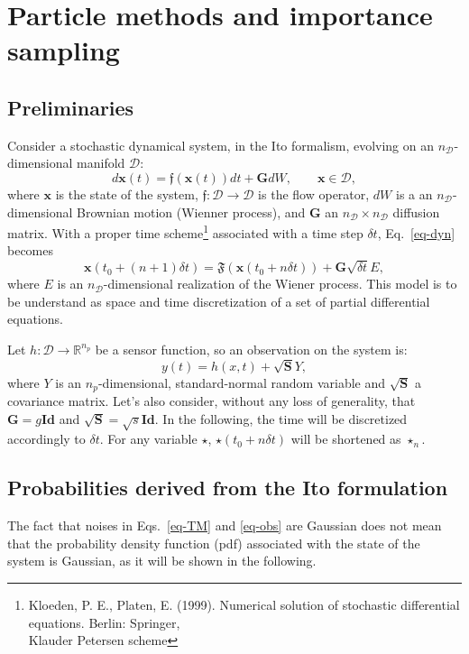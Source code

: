 \documentclass[aip,pof,nofootinbib,reprint,onecolumn]{revtex4-1}
\newcommand{\gras}[1]{\boldsymbol{#1}}
\newcommand{\mypar}[1]{\left(#1\right)}
\newcommand{\Ephaz}{\mathcal{D}}%
\newcommand{\Nphaz}{n_{\mathcal{D}}} %
\newcommand{\Nm}{n_p} %
\newcommand{\flot}{\mathfrak{f}} %
\newcommand{\fint}{\mathfrak{F}} %
\newcommand{\obs}{y} %
\newcommand{\point}{\gras{x}} %
\begin{document}
%
\section{Particle methods and importance sampling}
\label{sec-ipf}
\subsection{Preliminaries}
Consider a stochastic dynamical system, in the Ito formalism, evolving on an $\Nphaz$-dimensional manifold $\Ephaz$:
\begin{equation}
d \point\mypar{t} = \flot\mypar{\point\mypar{t}}dt + \gras{G}dW, \qquad \point \in \Ephaz,
\label{eq-dyn}
\end{equation}
where $\point$ is the state of the system, $\flot:\Ephaz \rightarrow \Ephaz$
is the flow operator, $dW$ is a an $\Nphaz$-dimensional Brownian motion
(Wienner process), and $\gras{G}$ an $\Nphaz\times \Nphaz$ diffusion matrix.
With a proper time scheme\footnote{Kloeden, P. E., Platen, E. (1999).
  Numerical solution of stochastic differential equations. Berlin:
  Springer,\\ Klauder Petersen scheme} associated with a time step
$\delta t$, Eq.~\eqref{eq-dyn} becomes
\begin{equation}
\point\mypar{t_0+\mypar{n+1}\delta t} =  \fint\mypar{\point\mypar{t_0+n\delta t}}+\gras{G}\sqrt{\delta t} E,
\label{eq-TM}
\end{equation}
where $E$ is an $\Nphaz$-dimensional realization of the Wiener process. 
This model is to be understand as space and time discretization of a set of partial differential equations.

Let $h:\Ephaz \rightarrow \mathbb{R}^{\Nm}$ be a sensor function, so an observation on the system is:
\begin{equation}
 \obs(t) = h\mypar{x,t} + \sqrt{\gras{S}}Y,
\label{eq-obs}
\end{equation}
where $Y$ is an $\Nm$-dimensional, standard-normal random variable and
$\sqrt{\gras{S}}$ a covariance matrix. Let's also consider, without any loss
of generality, that $\gras{G} = g \gras{Id}$ and
$\sqrt{\gras{S}} = \sqrt{s} \gras{Id}$. In the following, the time will be
discretized accordingly to $\delta t$. For any variable $\star$,
$ \star\mypar{t_0+n\delta t}$ will be shortened as $ \star_n$.





\subsection{Probabilities derived from the Ito formulation}
The fact that noises in Eqs.~\eqref{eq-TM} and \eqref{eq-obs} are Gaussian does not mean that the probability density function (pdf) associated with the state of the system is Gaussian, as it will be shown in the following.
\end{document}
